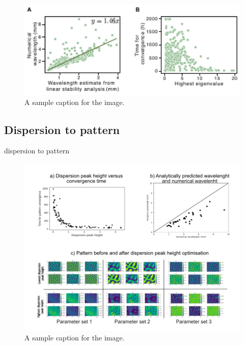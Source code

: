 \begin{figure}[H] %
    \centering
    \includegraphics[width=1\textwidth]{chapters/Chapter 1/dispersion_to_wavelength_convergence} %
    \caption{A sample caption for the image.}
    \label{fig:dispersion_to_wavelength_convergence} %
\end{figure}

\subsection{Dispersion to pattern}
dispersion to pattern
\begin{figure}[H] %
    \centering
    \includegraphics[width=1\textwidth]{chapters/Chapter 1/dispersion_to_shape} %
    \caption{A sample caption for the image.}
    \label{fig:dispersion_to_shape} %
\end{figure}



